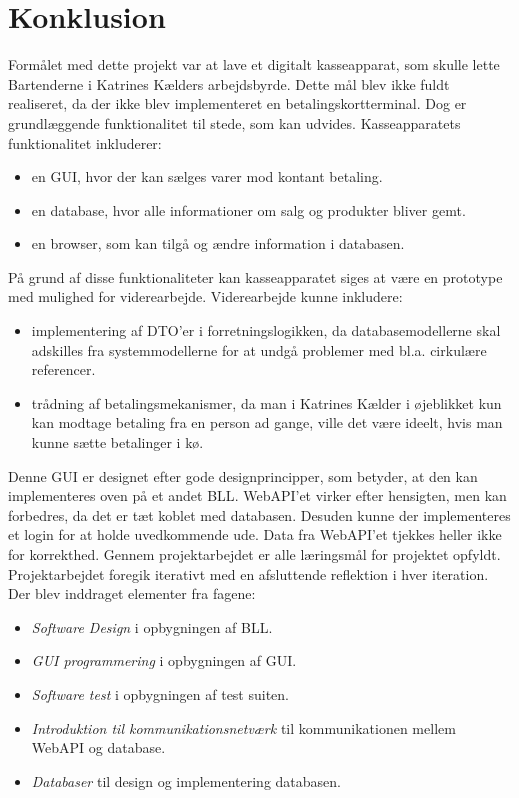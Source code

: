 \chapter{Konklusion}
Formålet med dette projekt var at lave et digitalt kasseapparat, som skulle lette Bartenderne i Katrines Kælders arbejdsbyrde. Dette mål blev ikke fuldt realiseret, da der ikke blev implementeret en betalingskortterminal. Dog er grundlæggende funktionalitet til stede, som kan udvides. Kasseapparatets funktionalitet inkluderer:
\begin{itemize}
	\item en \gls{GUI}, hvor der kan sælges varer mod kontant betaling.
	\item en database, hvor alle informationer om salg og produkter bliver gemt.
	\item en browser, som kan tilgå og ændre information i databasen.
\end{itemize}
På grund af disse funktionaliteter kan kasseapparatet siges at være en prototype med mulighed for viderearbejde. Viderearbejde kunne inkludere:
\begin{itemize}
	\item implementering af \gls{DTO}'er i forretningslogikken, da databasemodellerne skal adskilles fra systemmodellerne for at undgå problemer med bl.a. cirkulære referencer.
	\item trådning af betalingsmekanismer, da man i Katrines Kælder i øjeblikket kun kan modtage betaling fra en person ad gange, ville det være ideelt, hvis man kunne sætte betalinger i kø.
\end{itemize}
Denne \gls{GUI} er designet efter gode designprincipper, som betyder, at den kan implementeres oven på et andet \gls{BLL}.
\newline\newline
\gls{WebAPI}'et virker efter hensigten, men kan forbedres, da det er tæt koblet med databasen. Desuden kunne der implementeres et login for at holde uvedkommende ude. Data fra \gls{WebAPI}'et tjekkes heller ikke for korrekthed.
\newline\newline
Gennem projektarbejdet er alle læringsmål for projektet opfyldt. Projektarbejdet foregik iterativt med en afsluttende reflektion i hver iteration. Der blev inddraget elementer fra fagene:
\begin{itemize}
	\item \textit{Software Design} i opbygningen af \gls{BLL}. 
	\item \textit{GUI programmering} i opbygningen af \gls{GUI}.
	\item \textit{Software test} i opbygningen af test suiten.
	\item \textit{Introduktion til kommunikationsnetværk} til kommunikationen mellem \gls{WebAPI} og database. 
	\item \textit{Databaser} til design og implementering databasen.
 \end{itemize}